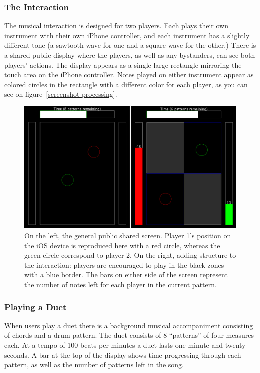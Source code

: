 \documentclass{article}
\begin{document}
\subsubsection{The Interaction}

The musical interaction is designed for two players.  Each plays their own instrument with their own iPhone controller, and each instrument has a slightly different tone (a sawtooth wave for one and a square wave for the other.)  There is a shared public display where the players, as well as any bystanders, can see both players' actions.  The display appears as a single large rectangle mirroring the touch area on the iPhone controller.  Notes played on either instrument appear as colored circles in the rectangle with a different color for each player, as you can see on figure~\ref{screenshot-processing}.

\begin{figure}[tb]
\includegraphics[width=\columnwidth]{screenshot-processing.png}
\caption{On the left, the general public shared screen. Player 1's position on the iOS device is reproduced here with a red circle, whereas the green circle correspond to player 2. On the right, adding structure to the interaction: players are encouraged to play in the black zones with a blue border. The bars on either side of the screen represent the number of notes left for each player in the current pattern.}
\label{struct}
\end{figure}

\subsubsection{Playing a Duet}

When users play a duet there is a background musical accompaniment consisting of chords and a drum pattern.  The duet consists of 8 ``patterns'' of four measures each.  At a tempo of 100 beats per minutes a duet lasts one minute and twenty seconds.  A bar at the top of the display shows time progressing through each pattern, as well as the number of patterns left in the song.  
\end{document}

